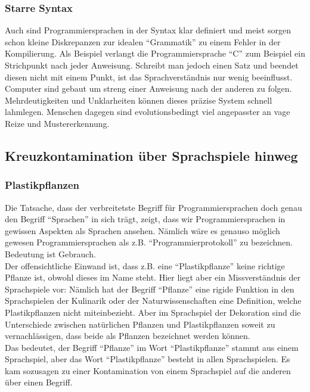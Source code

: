 \documentclass[10pt,a4paper]{article}
\begin{document}
\subsubsection{Starre Syntax}
Auch sind Programmiersprachen in der Syntax klar definiert und meist sorgen schon kleine Diskrepanzen zur idealen \enquote{Grammatik} zu einem Fehler in der Kompilierung. Als Beispiel verlangt die Programmiersprache \enquote{C} zum Beispiel ein Strichpunkt nach jeder Anweisung. Schreibt man jedoch einen Satz und beendet diesen nicht mit einem Punkt, ist das Sprachverständnis nur wenig beeinflusst. Computer sind gebaut um streng einer Anweisung nach der anderen zu folgen. Mehrdeutigkeiten und Unklarheiten können dieses präzise System schnell lahmlegen. Menschen dagegen sind evolutionsbedingt viel angepasster an vage Reize und Mustererkennung.

\subsection{Kreuzkontamination über Sprachspiele hinweg}

\subsubsection{Plastikpflanzen}
Die Tatsache, dass der verbreitetste Begriff für Programmiersprachen doch genau den Begriff \enquote{Sprachen} in sich trägt, zeigt, dass wir Programmiersprachen in gewissen Aspekten als Sprachen ansehen. Nämlich wäre es genauso möglich gewesen Programmiersprachen als z.B. \enquote{Programmierprotokoll} zu bezeichnen. Bedeutung ist Gebrauch. \\
Der offensichtliche Einwand ist, dass z.B. eine \enquote{Plastikpflanze} keine richtige Pflanze ist, obwohl dieses im Name steht. Hier liegt aber ein Missverständnis der Sprachspiele vor: Nämlich hat der Begriff \enquote{Pflanze} eine rigide Funktion in den Sprachspielen der Kulinarik oder der Naturwissenschaften eine Definition, welche Plastikpflanzen nicht miteinbezieht. Aber im Sprachspiel der Dekoration sind die Unterschiede zwischen natürlichen Pflanzen und Plastikpflanzen soweit zu vernachlässigen, dass beide als Pflanzen bezeichnet werden können. \\
Das bedeutet, der Begriff \enquote{Pflanze} im Wort \enquote{Plastikpflanze} stammt aus einem Sprachspiel, aber das Wort \enquote{Plastikpflanze} besteht in allen Sprachspielen. Es kam sozusagen zu einer Kontamination von einem Sprachspiel auf die anderen über einen Begriff.
\end{document}
